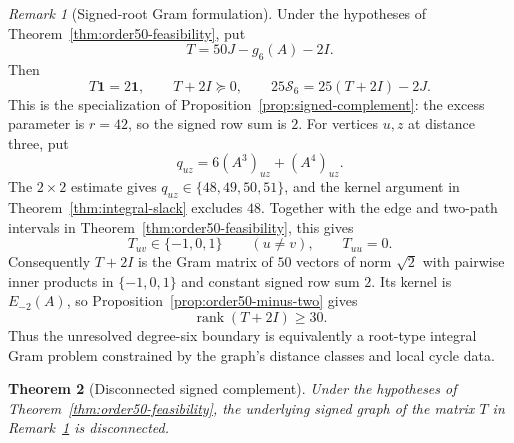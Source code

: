 \documentclass[a4paper,10pt,reqno]{amsart}
\theoremstyle{plain}
\newtheorem{theorem}{Theorem}[section]
\theoremstyle{definition}
\theoremstyle{remark}
\newtheorem{remark}[theorem]{Remark}
\newcommand{\one}{\mathbf 1}
\begin{document}
\begin{remark}[Signed-root Gram formulation]\label{rem:signed-root}
Under the hypotheses of Theorem~\ref{thm:order50-feasibility}, put
\[
 T=50J-g_6(A)-2I.
\]
Then
\[
 T\one=2\one,\qquad T+2I\succeq0,
 \qquad 25\mathcal S_6=25(T+2I)-2J.
\]
This is the specialization of Proposition~\ref{prop:signed-complement}:
the excess parameter is \(r=42\), so the signed row sum is \(2\).
For vertices \(u,z\) at distance three, put
\[
 q_{uz}=6(A^3)_{uz}+(A^4)_{uz}.
\]
The \(2\times2\) estimate gives \(q_{uz}\in\{48,49,50,51\}\), and the kernel
argument in Theorem~\ref{thm:integral-slack} excludes \(48\).  Together with
the edge and two-path intervals in Theorem~\ref{thm:order50-feasibility}, this
gives
\[
 T_{uv}\in\{-1,0,1\}\qquad(u\ne v),\qquad T_{uu}=0.
\]
 Consequently \(T+2I\) is the Gram matrix of \(50\) vectors of norm
 \(\sqrt2\) with pairwise inner products in \(\{-1,0,1\}\) and constant signed
 row sum \(2\).  Its kernel is \(E_{-2}(A)\), so
 Proposition~\ref{prop:order50-minus-two} gives
 \[
  \operatorname{rank}(T+2I)\ge30.
 \]
 Thus the unresolved degree-six boundary is equivalently a
 root-type integral Gram problem constrained by the graph's distance classes
 and local cycle data.
\end{remark}

\begin{theorem}[Disconnected signed complement]\label{thm:order50-disconnected}
Under the hypotheses of Theorem~\ref{thm:order50-feasibility}, the underlying
signed graph of the matrix \(T\) in Remark~\ref{rem:signed-root} is
disconnected.
\end{theorem}
\end{document}
